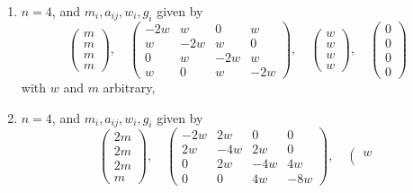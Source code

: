 \begin{lemma}
\begin{enumerate}
$$\begin{matrix}
0 & 2w & -4w
\end{matrix}
\right),
\quad
\left(
\begin{matrix}
2w \\
w \\
2w
\end{matrix}
\right),
\quad
\left(
\begin{matrix}
0 \\
0 \\
0
\end{matrix}
\right)
$$
with $w$ and $m$ arbitrary,
\item
\label{item-four-cycle}
$n = 4$, and $m_i, a_{ij}, w_i, g_i$ given by
$$
\left(
\begin{matrix}
m \\
m \\
m \\
m
\end{matrix}
\right),
\quad
\left(
\begin{matrix}
-2w & w & 0 & w \\
w & -2w & w & 0 \\
0 & w & -2w & w \\
w & 0 & w & -2w
\end{matrix}
\right),
\quad
\left(
\begin{matrix}
w \\
w \\
w \\
w
\end{matrix}
\right),
\quad
\left(
\begin{matrix}
0 \\
0 \\
0 \\
0
\end{matrix}
\right)
$$
with $w$ and $m$ arbitrary,
\item
\label{item-up-equal-up}
$n = 4$, and $m_i, a_{ij}, w_i, g_i$ given by
$$
\left(
\begin{matrix}
2m \\
2m \\
2m \\
m
\end{matrix}
\right),
\quad
\left(
\begin{matrix}
-2w & 2w & 0 & 0 \\
2w & -4w & 2w & 0 \\
0 & 2w & -4w & 4w \\
0 & 0 & 4w & -8w
\end{matrix}
\right),
\quad
\left(
\begin{matrix}
w \\

\end{matrix}$$
\end{enumerate}
\end{lemma}
